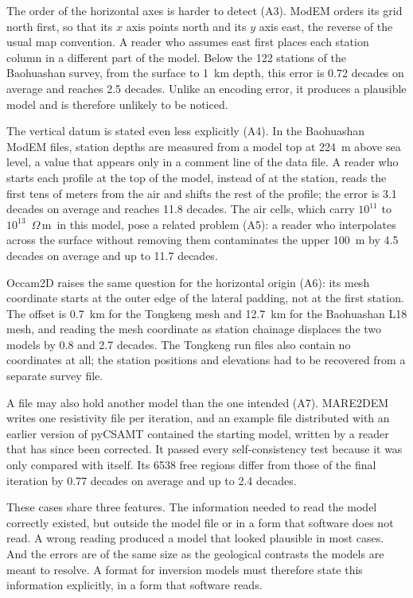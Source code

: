 \documentclass[manuscript]{geophysics}
\newcommand{\ohmm}{\ensuremath{\Omega\,\mathrm{m}}}
\begin{document}
The order of the horizontal axes is harder to detect (A3). ModEM
orders its grid north first, so that its $x$ axis points north and its $y$
axis east, the reverse of the usual map convention. A reader who
assumes east first places each station column in a different part of
the model. Below the 122 stations of the Baohuashan survey, from the
surface to 1~km depth, this error is 0.72 decades on average and
reaches 2.5 decades. Unlike an encoding error, it produces a plausible
model and is therefore unlikely to be noticed.

The vertical datum is stated even less explicitly (A4). In the
Baohuashan ModEM files,
station depths are measured from a model top at 224~m above sea level,
a value that appears only in a comment line of the data file. A reader
who starts each profile at the top of the model, instead of at the
station, reads the first tens of meters from the air and shifts the
rest of the profile; the error is 3.1 decades on average and reaches
11.8 decades. The air cells, which carry $10^{11}$ to
$10^{13}$~\ohmm\ in this model, pose a related problem (A5): a reader
who interpolates across the surface without removing them contaminates
the upper 100~m by 4.5 decades on average and up to 11.7 decades.

Occam2D raises the same question for the horizontal origin (A6):
its mesh coordinate starts at the outer edge of the lateral padding,
not at the first station. The offset is 0.7~km for the
Tongkeng mesh and 12.7~km for the Baohuashan L18 mesh, and reading the
mesh coordinate as station chainage displaces the two models by 0.8
and 2.7 decades. The Tongkeng run files also contain no coordinates
at all; the station positions and elevations had to be recovered from
a separate survey file.

A file may also hold another model than the one intended (A7).
MARE2DEM writes one resistivity file per iteration, and an example file
distributed with an earlier version of pyCSAMT contained the starting
model, written by a reader that has since been corrected. It passed
every self-consistency test because it was only compared with
itself. Its
6538 free regions differ from those of the final iteration by 0.77
decades on average and up to 2.4 decades.

These cases share three features. The information needed to read the
model correctly existed, but outside the model file or in a form that
software does not read. A wrong reading produced a model that looked
plausible in most cases. And the errors are of the same size as the
geological contrasts the models are meant to resolve. A format for
inversion models must therefore state this information explicitly, in
a form that software reads.
\end{document}

